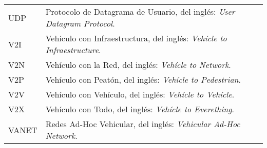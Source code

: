 \pagebreak
\begin{tabular}{p{2cm} p{13.3cm}}
UDP & Protocolo de Datagrama de Usuario, del inglés: \textit{User Datagram Protocol}.\\
V2I & Vehículo con Infraestructura, del inglés: \textit{Vehícle to Infraestructure}.\\
V2N & Vehículo con la Red, del inglés: \textit{Vehícle to Network}.\\
V2P & Vehículo con Peatón, del inglés: \textit{Vehícle to Pedestrian}.\\
V2V & Vehículo con Vehículo, del inglés: \textit{Vehícle to Vehícle}.\\
V2X & Vehículo con Todo, del inglés: \textit{Vehícle to Everething}.\\
VANET & Redes Ad-Hoc Vehicular, del inglés: \textit{Vehicular Ad-Hoc Network}.
\end{tabular}